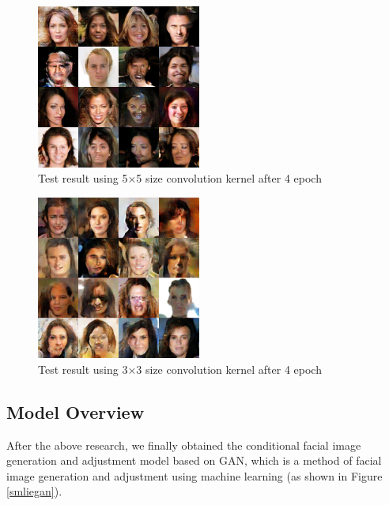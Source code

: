 \begin{figure}
    \begin{center}
    \includegraphics[width=0.48\textwidth]{figures/result_conv_kernel_5.png}
    \caption{Test result using 5×5 size convolution kernel after 4 epoch}
    \label{conv_kernel_5}
    \end{center}
\end{figure}
\begin{figure}
    \begin{center}
    \includegraphics[width=0.48\textwidth]{figures/result_conv_kernel_3.png}
    \caption{Test result using 3×3 size convolution kernel after 4 epoch}
    \label{conv_kernel_3}
    \end{center}
\end{figure}


\subsection{Model Overview}

After the above research, we finally obtained the conditional facial image generation and adjustment model based on GAN,
    which is a method of facial image generation and adjustment using machine learning (as shown in Figure \ref{smliegan}).

